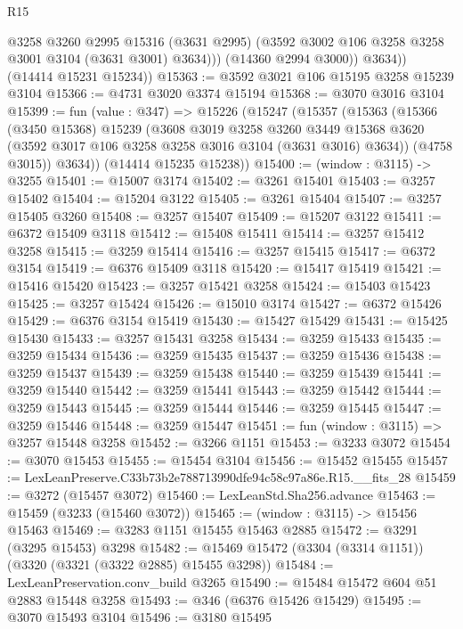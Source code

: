 \begin{lexlean}{R15}
\begin{coremodule}
                @3258
                @3260
                @2995
                @15316
                (@3631 @2995)
                (@3592 @3002 @106 @3258 @3258 @3001 @3104 (@3631 @3001) @3634)))
            (@14360 @2994 @3000))
          @3634))
      (@14414 @15231 @15234))
@15363 := @3592 @3021 @106 @15195 @3258 @15239 @3104
@15366 := @4731 @3020 @3374 @15194
@15368 := @3070 @3016 @3104
@15399 := fun (value : @347) =>
  @15226
    (@15247
      (@15357
        (@15363
          (@15366
            (@3450 @15368)
            @15239
            (@3608
              @3019
              @3258
              @3260
              @3449
              @15368
              @3620
              (@3592 @3017 @106 @3258 @3258 @3016 @3104 (@3631 @3016) @3634))
            (@4758 @3015))
          @3634))
      (@14414 @15235 @15238))
@15400 := (window : @3115) -> @3255
@15401 := @15007 @3174
@15402 := @3261 @15401
@15403 := @3257 @15402
@15404 := @15204 @3122
@15405 := @3261 @15404
@15407 := @3257 @15405 @3260
@15408 := @3257 @15407
@15409 := @15207 @3122
@15411 := @6372 @15409 @3118
@15412 := @15408 @15411
@15414 := @3257 @15412 @3258
@15415 := @3259 @15414
@15416 := @3257 @15415
@15417 := @6372 @3154
@15419 := @6376 @15409 @3118
@15420 := @15417 @15419
@15421 := @15416 @15420
@15423 := @3257 @15421 @3258
@15424 := @15403 @15423
@15425 := @3257 @15424
@15426 := @15010 @3174
@15427 := @6372 @15426
@15429 := @6376 @3154 @15419
@15430 := @15427 @15429
@15431 := @15425 @15430
@15433 := @3257 @15431 @3258
@15434 := @3259 @15433
@15435 := @3259 @15434
@15436 := @3259 @15435
@15437 := @3259 @15436
@15438 := @3259 @15437
@15439 := @3259 @15438
@15440 := @3259 @15439
@15441 := @3259 @15440
@15442 := @3259 @15441
@15443 := @3259 @15442
@15444 := @3259 @15443
@15445 := @3259 @15444
@15446 := @3259 @15445
@15447 := @3259 @15446
@15448 := @3259 @15447
@15451 := fun (window : @3115) => @3257 @15448 @3258
@15452 := @3266 @1151
@15453 := @3233 @3072
@15454 := @3070 @15453
@15455 := @15454 @3104
@15456 := @15452 @15455
@15457 := LexLeanPreserve.C33b73b2e788713990dfe94c58c97a86e.R15.__fits_28
@15459 := @3272 (@15457 @3072)
@15460 := LexLeanStd.Sha256.advance
@15463 := @15459 (@3233 (@15460 @3072))
@15465 := (window : @3115) -> @15456 @15463
@15469 := @3283 @1151 @15455 @15463 @2885
@15472 := @3291 (@3295 @15453) @3298
@15482 := @15469 @15472 (@3304 (@3314 @1151)) (@3320 (@3321 (@3322 @2885) @15455 @3298))
@15484 := LexLeanPreservation.conv_build @3265
@15490 := @15484 @15472 @604 @51 @2883 @15448 @3258
@15493 := @346 (@6376 @15426 @15429)
@15495 := @3070 @15493 @3104
@15496 := @3180 @15495

\end{coremodule}
\end{lexlean}
